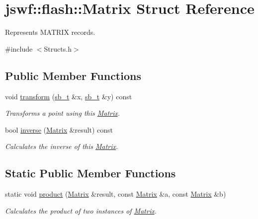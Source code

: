 \hypertarget{structjswf_1_1flash_1_1_matrix}{\section{jswf\+:\+:flash\+:\+:Matrix Struct Reference}
\label{structjswf_1_1flash_1_1_matrix}
}


Represents {\ttfamily M\+A\+T\+R\+I\+X} records.  




{\ttfamily \#include $<$Structs.\+h$>$}

\subsection*{Public Member Functions}
\begin{DoxyCompactItemize}
\item 
void \hyperlink{structjswf_1_1flash_1_1_matrix_ae8dfa5d146be75927027d747d63cb327}{transform} (\hyperlink{namespacejswf_aa56b2b764590a9e19a5e66693364aceb}{sb\+\_\+t} \&x, \hyperlink{namespacejswf_aa56b2b764590a9e19a5e66693364aceb}{sb\+\_\+t} \&y) const 
\begin{DoxyCompactList}\small\item\em Transforms a point using this \hyperlink{structjswf_1_1flash_1_1_matrix}{Matrix}. \end{DoxyCompactList}\item 
bool \hyperlink{structjswf_1_1flash_1_1_matrix_adbd0725baff1dff4b83f8ee959c0ea73}{inverse} (\hyperlink{structjswf_1_1flash_1_1_matrix}{Matrix} \&result) const 
\begin{DoxyCompactList}\small\item\em Calculates the inverse of this \hyperlink{structjswf_1_1flash_1_1_matrix}{Matrix}. \end{DoxyCompactList}\end{DoxyCompactItemize}
\subsection*{Static Public Member Functions}
\begin{DoxyCompactItemize}
\item 
static void \hyperlink{structjswf_1_1flash_1_1_matrix_a29e96996ccb5f7dba395bfda3c0aa45a}{product} (\hyperlink{structjswf_1_1flash_1_1_matrix}{Matrix} \&result, const \hyperlink{structjswf_1_1flash_1_1_matrix}{Matrix} \&a, const \hyperlink{structjswf_1_1flash_1_1_matrix}{Matrix} \&b)
\begin{DoxyCompactList}\small\item\em Calculates the product of two instances of \hyperlink{structjswf_1_1flash_1_1_matrix}{Matrix}. \end{DoxyCompactList}\end{DoxyCompactItemize}
